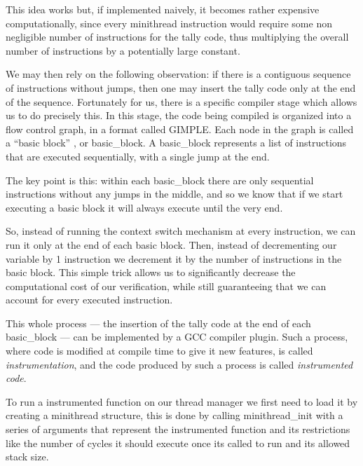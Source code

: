 \documentclass[12pt,a4paper]{report}
\begin{document}
This idea works but, if implemented naively, it becomes rather expensive computationally, since every minithread instruction would require some non negligible number of instructions for the tally code, thus multiplying the overall number of instructions by a potentially large constant.

We may then rely on the following observation: if there is a contiguous sequence of instructions without jumps, then one may insert the tally code only at the end of the sequence. Fortunately for us, there is a specific compiler stage which allows us to do precisely this. In this stage, the code being compiled is organized into a flow control graph, in a format called GIMPLE. Each node in the graph is called a ``basic block'' \cite{gimple bb}, or basic\_block. A basic\_block represents a list of instructions that are executed sequentially, with a single jump at the end. 


The key point is this: within each basic\_block there are only sequential instructions without any jumps in the middle, and so we know that if we start executing a basic block it will always execute until the very end. 

So, instead of running the context switch mechanism at every instruction, we can run it only at the end of each basic block. Then, instead of decrementing our variable by 1 instruction we decrement it by the number of instructions in the basic block. This simple trick allows us to significantly decrease the computational cost of our verification, while still guaranteeing that we can account for every executed instruction.

This whole process --- the insertion of the tally code at the end of each basic\_block --- can be implemented by a GCC compiler plugin. Such a process, where code is modified at compile time to give it new features, is called \textit{instrumentation}, and the code produced by such a process is called \textit{instrumented code}.

To run a instrumented function on our thread manager we first need to load it by creating a minithread structure, this is done by calling minithread\_init with a series of arguments that represent the instrumented function and its restrictions like the number of cycles it should execute once its called to run and its allowed stack size.
\end{document}
